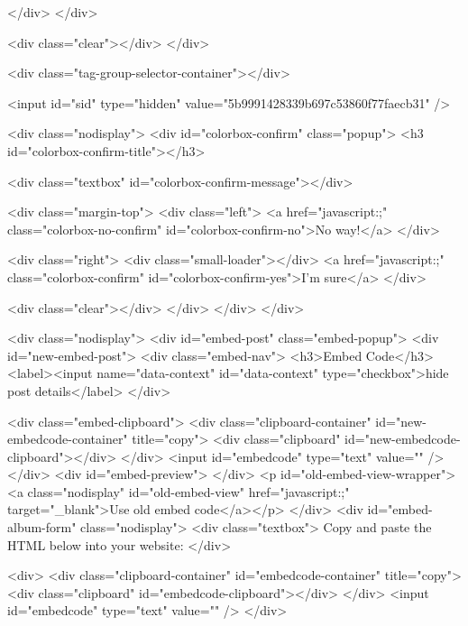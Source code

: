         </div>
        </div>

        <div class="clear"></div>
    </div>

    <div class="tag-group-selector-container"></div>

    <input id="sid" type="hidden" value="5b9991428339b697c53860f77faecb31" />

    <div class="nodisplay">
	<div id="colorbox-confirm" class="popup">
		<h3 id="colorbox-confirm-title"></h3>
		
		<div class="textbox" id="colorbox-confirm-message"></div>

		<div class="margin-top">
			<div class="left">
				<a href="javascript:;" class="colorbox-no-confirm" id="colorbox-confirm-no">No way!</a>
			</div>
			
			<div class="right">
				<div class="small-loader"></div>
				<a href="javascript:;" class="colorbox-confirm" id="colorbox-confirm-yes">I'm sure</a>
			</div>
			
			<div class="clear"></div>
		</div>
	</div>
</div>

    <div class="nodisplay">
    <div id="embed-post" class="embed-popup">
        <div id="new-embed-post">
            <div class="embed-nav">
                <h3>Embed Code</h3>
                <label><input name="data-context" id="data-context" type="checkbox">hide post details</label>
            </div>

            <div class="embed-clipboard">
                <div class="clipboard-container" id="new-embedcode-container" title="copy">
                    <div class="clipboard" id="new-embedcode-clipboard"></div>
                </div>
                <input id="embedcode" type="text" value="" />
            </div>
            <div id="embed-preview">
            </div>
            <p id="old-embed-view-wrapper"><a class="nodisplay" id="old-embed-view" href="javascript:;" target="_blank">Use old embed code</a></p>
        </div>
        <div id="embed-album-form" class="nodisplay">
            <div class="textbox">
                Copy and paste the HTML below into your website:
            </div>

            <div>
                <div class="clipboard-container" id="embedcode-container" title="copy">
                    <div class="clipboard" id="embedcode-clipboard"></div>
                </div>
                <input id="embedcode" type="text" value="" />
            </div>

